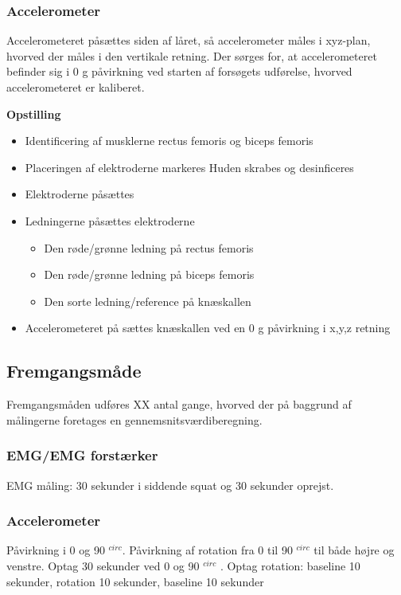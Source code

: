 \subsubsection{Accelerometer}
Accelerometeret påsættes siden af låret, så accelerometer måles i xyz-plan, hvorved der måles i den vertikale retning. Der sørges for,  at accelerometeret befinder sig i 0 g påvirkning ved starten af forsøgets udførelse, hvorved accelerometeret er kaliberet. 

\textbf{Opstilling}
\begin{itemize}
\item Identificering af musklerne rectus femoris og biceps femoris 
\item Placeringen af elektroderne markeres
 Huden skrabes og desinficeres
\item Elektroderne påsættes
\item Ledningerne påsættes elektroderne
\begin{itemize}
\item Den røde/grønne ledning på rectus femoris
\item Den røde/grønne ledning på biceps femoris
\item Den sorte ledning/reference på knæskallen 
\end{itemize} 
\item Accelerometeret på sættes knæskallen ved en 0 g påvirkning i x,y,z retning
\end{itemize}


\subsection{Fremgangsmåde}
Fremgangsmåden udføres XX antal gange, hvorved der på baggrund af målingerne foretages en gennemsnitsværdiberegning.

\subsubsection{EMG/EMG forstærker}
EMG måling: 30 sekunder i siddende squat og 30 sekunder oprejst.

\subsubsection{Accelerometer}
Påvirkning i 0 og 90 $^{circ}$.
Påvirkning af rotation fra 0 til 90 $^{circ}$ til både højre og venstre.
Optag 30 sekunder ved 0 og 90 $^{circ}$ .
Optag rotation: baseline 10 sekunder, rotation 10 sekunder, baseline 10 sekunder




